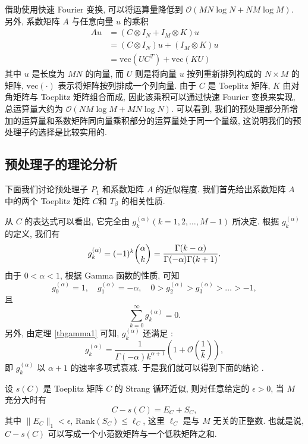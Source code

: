 \documentclass{ecnumaster}
\begin{document}
借助使用快速 Fourier 变换, 可以将运算量降低到 $\mathcal{O}(MN \log N + NM \log M)$.
另外, 系数矩阵 $A$ 与任意向量 $u$ 的乘积
\begin{equation}\label{eq418}
  \begin{split}
    Au &= (C \otimes I_N + I_M \otimes K) u\\
       &= (C \otimes I_N)u + (I_M \otimes K)u\\
       &= \mathrm{vec}(U C^{T}) + \mathrm{vec}(KU)
  \end{split}
\end{equation}
其中 $u$ 是长度为 $MN$ 的向量, 而 $U$ 则是将向量 $u$
按列重新排列构成的 $N \times M$ 的矩阵,
$\mathrm{vec}(\cdot)$ 表示将矩阵按列排成一个列向量.
由于 $C$ 是 Toeplitz 矩阵, $K$ 由对角矩阵与 Toeplitz 矩阵组合而成,
因此该乘积可以通过快速 Fourier 变换来实现,
总运算量大约为 $\mathcal{O}(NM \log M + MN \log N)$.
可以看到,
我们的预处理部分所增加的运算量和系数矩阵同向量乘积部分的运算量处于同一个量级,
这说明我们的预处理子的选择是比较实用的.

\subsection{预处理子的理论分析}

下面我们讨论预处理子 $P_1$ 和系数矩阵 $A$ 的近似程度.
我们首先给出系数矩阵 $A$ 中的两个 Toeplitz 矩阵 $C$和 $T_{\beta}$ 的相关性质.

从 $C$ 的表达式可以看出, 它完全由 $g_k^{(\alpha)}(k = 1, 2, \dots, M-1)$ 所决定.
根据 $g_k^{(\alpha)}$ 的定义, 我们有
$$
  g_k^{(\alpha)} = (-1)^k \dbinom{\alpha}{k}
  = \frac{\Gamma (k- \alpha)}{\Gamma (-\alpha)\Gamma (k+1)}.
$$
由于 $0<\alpha<1$, 根据 Gamma 函数的性质, 可知 \cite{MT04}
$$
  g_0^{(\alpha)} = 1, \quad g_1^{(\alpha)} = -\alpha, 
  \quad 0 > g_2^{(\alpha)} > g_3^{(\alpha)} > \dots > -1,
$$
且
\begin{equation}\label{eq430}
    \sum _{k=0}^{\infty} g_k^{(\alpha)} = 0.
\end{equation}
另外, 由定理 \ref{thgamma1} 可知, $g_k^{(\alpha)}$ 还满足 \cite{WWS10}:
$$
  g_k^{(\alpha)} =
  \frac{1}{\Gamma(-\alpha) k^{\alpha + 1}} \left( 1 + \mathcal{O} \left( \frac{1}{k}\right)\right),
$$
即 $g_k^{(\alpha)}$ 以 $\alpha + 1$ 的速率多项式衰减.
于是我们就可以得到下面的结论 \cite{CS89}.

\begin{theorem}\label{Th:s-C0}
  设 $s(C)$ 是 Toeplitz 矩阵 $C$ 的 Strang 循环近似, 
  则对任意给定的 $\epsilon>0$, 当 $M$ 充分大时有 
  $$C - s(C) = E_C + S_C,$$
  其中 $\|E_C\|_1<\epsilon$, $\mathrm{Rank}(S_C)\leq\ell_C$, 
  这里 $\ell_C$ 是与 $M$ 无关的正整数. 
  也就是说, $C - s(C)$ 可以写成一个小范数矩阵与一个低秩矩阵之和.
\end{theorem}
  
\end{document}
